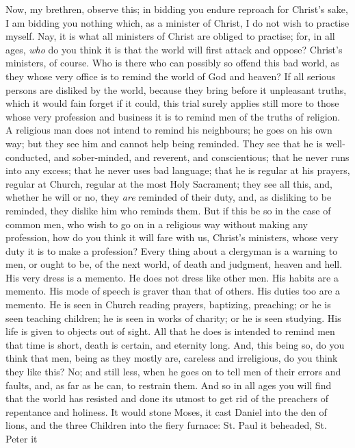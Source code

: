 Now, my brethren, observe this; in bidding you endure reproach for
Christ's sake, I am bidding you nothing which, as a minister of
Christ, I do not wish to practise myself. Nay, it is what all
ministers of Christ are obliged to practise; for, in all ages, \emph{who}
do you think it is that the world will first attack and oppose?
Christ's ministers, of course. Who is there who can possibly so offend
this bad world, as they whose very office is to remind the world of
God and heaven? If all serious persons are disliked by the world,
because they bring before it unpleasant truths, which it would fain
forget if it could, this trial surely applies still more to those
whose very profession and business it is to remind men of the truths
of religion. A religious man does not intend to remind his neighbours;
he goes on his own way; but they see him and cannot help being
reminded. They see that he is well-conducted, and sober-minded, and
reverent, and conscientious; that he never runs into any excess; that
he never uses bad language; that he is regular at his prayers, regular
at Church, regular at the most Holy Sacrament; they see all this, and,
whether he will or no, they \emph{are} reminded of their duty, and, as
disliking to be reminded, they dislike him who reminds them. But if
this be so in the case of common men, who wish to go on in a religious
way without making any profession, how do you think it will fare with
us, Christ's ministers, whose very duty it is to make a profession?
Every thing about a clergyman is a warning to men, or ought to be, of
the next world, of death and judgment, heaven and hell. His very dress
is a memento. He does not dress like other men. His habits are a
memento. His mode of speech is graver than that of others. His duties
too are a memento. He is seen in Church reading prayers, baptizing,
preaching; or he is seen teaching children; he is seen in works of
charity; or he is seen studying. His life is given to objects out of
sight. All that he does is intended to remind men that time is short,
death is certain, and eternity long. And, this being so, do you think
that men, being as they mostly are, careless and irreligious, do you
think they like this? No; and still less, when he goes on to tell men
of their errors and faults, and, as far as he can, to restrain them.
And so in all ages you will find that the world has resisted and done
its utmost to get rid of the preachers of repentance and holiness. It
would stone Moses, it cast Daniel into the den of lions, and the three
Children into the fiery furnace: St. Paul it beheaded, St. Peter it

